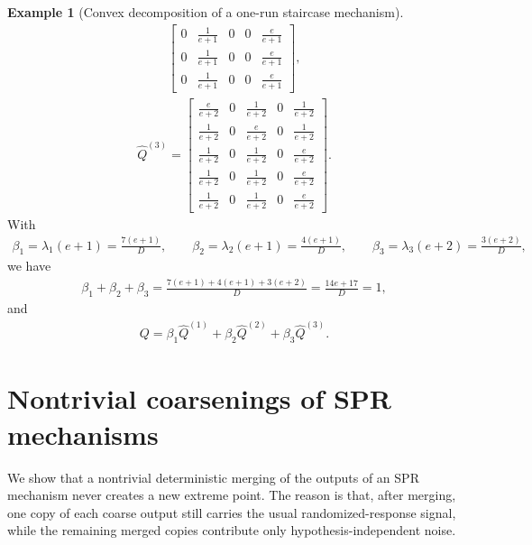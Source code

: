 \documentclass{article}
\theoremstyle{plain}
\theoremstyle{definition}
\newtheorem{example}[theorem]{Example}
\theoremstyle{plain}
\begin{document}
\begin{example}[Convex decomposition of a one-run staircase mechanism]
\begin{align*}
\begin{bmatrix}
    0 & \frac1{e+1} & 0 & 0 & \frac{e}{e+1}\\
    0 & \frac1{e+1} & 0 & 0 & \frac{e}{e+1}\\
    0 & \frac1{e+1} & 0 & 0 & \frac{e}{e+1}
    \end{bmatrix},
\end{align*}
\begin{align*}
    \widehat Q^{(3)}=
    \begin{bmatrix}
    \frac{e}{e+2} & 0 & \frac1{e+2} & 0 & \frac1{e+2}\\[4pt]
    \frac1{e+2} & 0 & \frac{e}{e+2} & 0 & \frac1{e+2}\\
    \frac1{e+2} & 0 & \frac1{e+2} & 0 & \frac{e}{e+2}\\
    \frac1{e+2} & 0 & \frac1{e+2} & 0 & \frac{e}{e+2}\\
    \frac1{e+2} & 0 & \frac1{e+2} & 0 & \frac{e}{e+2}
    \end{bmatrix}.
\end{align*}
With
\begin{align*}
    \beta_1=\lambda_1(e+1)=\frac{7(e+1)}{D},\qquad
    \beta_2=\lambda_2(e+1)=\frac{4(e+1)}{D},\qquad
    \beta_3=\lambda_3(e+2)=\frac{3(e+2)}{D},
\end{align*}
we have
\begin{align*}
    \beta_1+\beta_2+\beta_3
    =\frac{7(e+1)+4(e+1)+3(e+2)}{D}
    =\frac{14e+17}{D}=1,
\end{align*}
and
\begin{align*}
    Q=\beta_1\widehat Q^{(1)}+\beta_2\widehat Q^{(2)}+\beta_3\widehat Q^{(3)}.
\end{align*}
\end{example}

\section{Nontrivial coarsenings of SPR mechanisms}
\label{sec:proof-no-new-vertices-under-coarsening}

We show that a nontrivial deterministic merging of the outputs of an SPR mechanism never creates a new extreme point. The reason is that, after merging, one copy of each coarse output still carries the usual randomized-response signal, while the remaining merged copies contribute only hypothesis-independent noise.
\end{document}
